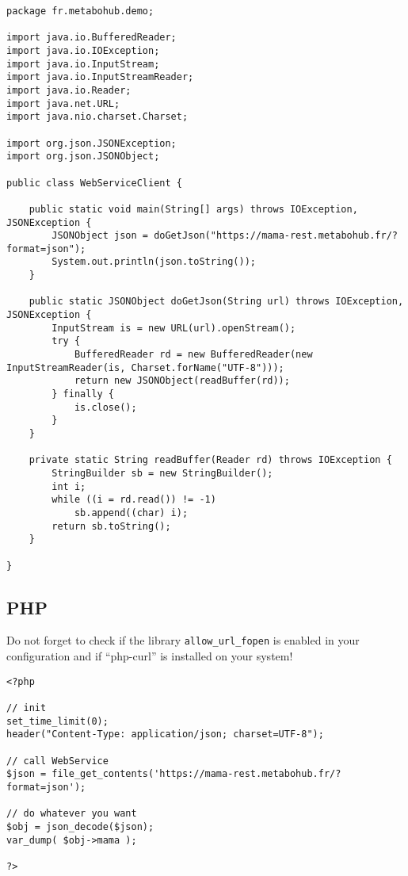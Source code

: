 \begin{lstlisting}[language=customJava,caption={Java request}]
package fr.metabohub.demo;

import java.io.BufferedReader;
import java.io.IOException;
import java.io.InputStream;
import java.io.InputStreamReader;
import java.io.Reader;
import java.net.URL;
import java.nio.charset.Charset;

import org.json.JSONException;
import org.json.JSONObject;

public class WebServiceClient {

	public static void main(String[] args) throws IOException, JSONException {
		JSONObject json = doGetJson("https://mama-rest.metabohub.fr/?format=json");
		System.out.println(json.toString());
	}

	public static JSONObject doGetJson(String url) throws IOException, JSONException {
		InputStream is = new URL(url).openStream();
		try {
			BufferedReader rd = new BufferedReader(new InputStreamReader(is, Charset.forName("UTF-8")));
			return new JSONObject(readBuffer(rd));
		} finally {
			is.close();
		}
	}

	private static String readBuffer(Reader rd) throws IOException {
		StringBuilder sb = new StringBuilder();
		int i;
		while ((i = rd.read()) != -1)
			sb.append((char) i);
		return sb.toString();
	}
	
}
\end{lstlisting}

\subsection{PHP}
\hspace*{\parindent}
Do not forget to check if the library \texttt{allow\_url\_fopen} is enabled in your configuration and if ``php-curl'' is installed on your system! 
\begin{lstlisting}[language=customPHP,caption={PHP request}]
<?php

// init
set_time_limit(0);
header("Content-Type: application/json; charset=UTF-8");

// call WebService
$json = file_get_contents('https://mama-rest.metabohub.fr/?format=json');

// do whatever you want
$obj = json_decode($json);
var_dump( $obj->mama );

?>
\end{lstlisting}

